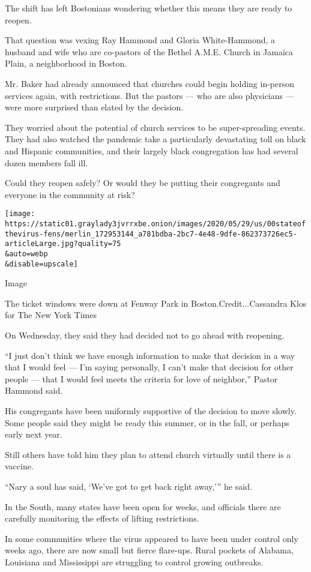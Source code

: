 The shift has left Bostonians wondering whether this means they are
ready to reopen.

That question was vexing Ray Hammond and Gloria White-Hammond, a husband
and wife who are co-pastors of the Bethel A.M.E. Church in Jamaica
Plain, a neighborhood in Boston.

Mr. Baker had already announced that churches could begin holding
in-person services again, with restrictions. But the pastors --- who are
also physicians --- were more surprised than elated by the decision.

They worried about the potential of church services to be
super-spreading events. They had also watched the pandemic take a
particularly devastating toll on black and Hispanic communities, and
their largely black congregation has had several dozen members fall ill.

Could they reopen safely? Or would they be putting their congregants and
everyone in the community at risk?

\texttt{[image: https://static01.graylady3jvrrxbe.onion/images/2020/05/29/us/00stateofthevirus-fens/merlin\_172953144\_a781bdba-2bc7-4e48-9dfe-862373726ec5-articleLarge.jpg?quality=75\\\&auto=webp\\\&disable=upscale]}

Image

The ticket windows were down at Fenway Park in Boston.Credit...Cassandra
Klos for The New York Times

On Wednesday, they said they had decided not to go ahead with reopening.

``I just don't think we have enough information to make that decision in
a way that I would feel --- I'm saying personally, I can't make that
decision for other people --- that I would feel meets the criteria for
love of neighbor,'' Pastor Hammond said.

His congregants have been uniformly supportive of the decision to move
slowly. Some people said they might be ready this summer, or in the
fall, or perhaps early next year.

Still others have told him they plan to attend church virtually until
there is a vaccine.

``Nary a soul has said, `We've got to get back right away,''' he said.

In the South, many states have been open for weeks, and officials there
are carefully monitoring the effects of lifting restrictions.

In some communities where the virus appeared to have been under control
only weeks ago, there are now small but fierce flare-ups. Rural pockets
of Alabama, Louisiana and Mississippi are struggling to control growing
outbreaks.

